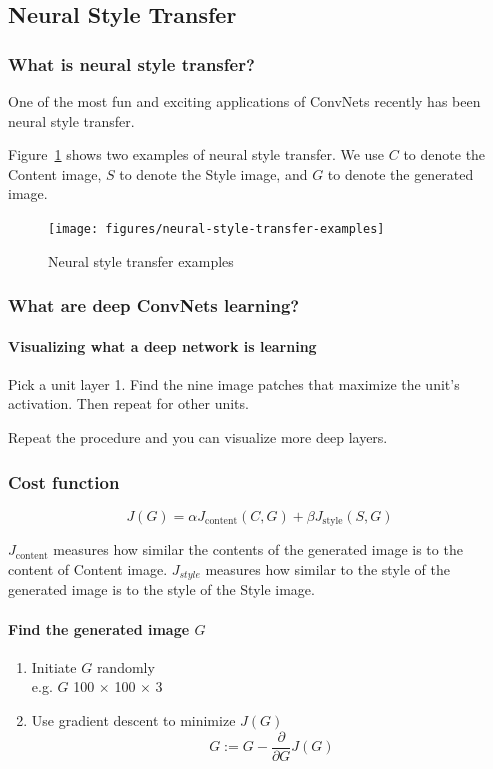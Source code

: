 \documentclass[UTF8]{article}
\begin{document}
\subsection{Neural Style Transfer}
\subsubsection{What is neural style transfer?}
One of the most fun and exciting applications of ConvNets recently has been neural style transfer.

Figure~\ref{fig:neural-style-transfer-examples} shows two examples of neural style transfer. We use
$C$ to denote the Content image, $S$ to denote the Style image, and $G$ to denote the generated
image.

\begin{figure}[htb]
    \centering
    \texttt{[image: figures/neural-style-transfer-examples]}
    \caption{Neural style transfer examples}
    \label{fig:neural-style-transfer-examples}
\end{figure}

\subsubsection{What are deep ConvNets learning?}
\paragraph{Visualizing what a deep network is learning}
Pick a unit layer 1. Find the nine image patches that maximize the unit's activation. Then repeat
for other units.

Repeat the procedure and you can visualize more deep layers.

\subsubsection{Cost function}
$$ J(G) = \alpha J_{\text{content}}(C, G) + \beta J_{\text{style}}(S, G) $$

$J_{\text{content}}$ measures how similar the contents of the generated image is to the content of
Content image. $J_{style}$ measures how similar to the style of the generated image is to the style
of the Style image.

\paragraph{Find the generated image $G$}
\begin{enumerate}
    \item Initiate $G$ randomly \\
    e.g. $G$ 100 $\times$ 100 $\times$ 3
    \item Use gradient descent to minimize $J(G)$
    $$ G := G - \frac{\partial}{\partial G} J(G) $$
\end{enumerate}
\end{document}
